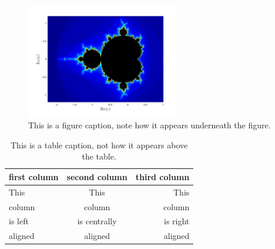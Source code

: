 \begin{figure}[H]
	\begin{center}
		\includegraphics[width = 0.6\textwidth]{Images/mandelbrot} %
		\caption{This is a figure caption, note how it appears underneath the figure.} %
		\label{fig:figure label} %
	\end{center}
\end{figure}

\begin{table}[H]
	\caption{This is a table caption, not how it appears above the table.}
	\label{tab:table label} %
	\begin{center}
		\begin{tabular}{lcr} %
			\toprule %
			first column & second column & third column \\
			\midrule %
			This & This & This \\
			column & column & column \\
			is left & is centrally & is right \\
			aligned & aligned & aligned \\
			\bottomrule %
		\end{tabular}
	\end{center}
\end{table}

